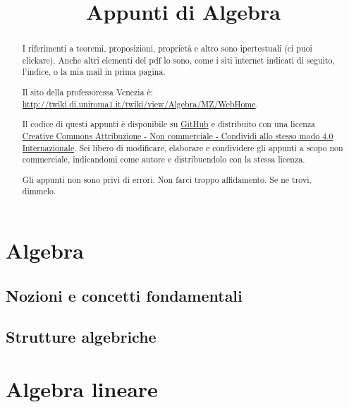 



\title{Appunti di Algebra}

\maketitle

\newpage

\tableofcontents
\newpage

\begin{abstract}
I riferimenti a teoremi, proposizioni, propriet\`a e altro sono ipertestuali (ci puoi clickare). Anche altri elementi del pdf lo sono, come i siti internet indicati di seguito, l'indice, o la mia mail in prima pagina.

Il sito della professoressa Venezia \`e: \url{http://twiki.di.uniroma1.it/twiki/view/Algebra/MZ/WebHome}.

Il codice di questi appunti \`e disponibile su \href{https://github.com/asmeikal/Appunti-Algebra-2014}{GitHub} e distribuito con una licenza \href{http://creativecommons.org/licenses/by-nc-sa/4.0/deed.it}{Creative Commons Attribuzione - Non commerciale - Condividi allo stesso modo 4.0 Internazionale}. Sei libero di modificare, elaborare e condividere gli appunti a scopo non commerciale, indicandomi come autore e distribuendolo con la stessa licenza.

Gli appunti non sono privi di errori. Non farci troppo affidamento. Se ne trovi, dimmelo.
\end{abstract}

\part{Algebra}

\chapter{Nozioni e concetti fondamentali}



\chapter{Strutture algebriche}



\part{Algebra lineare}

